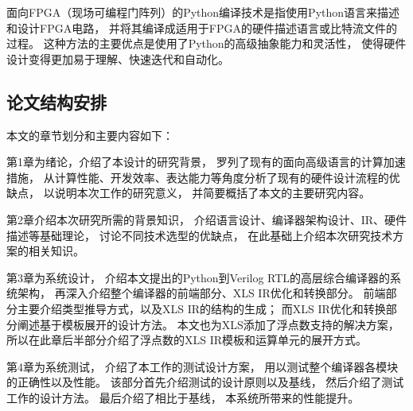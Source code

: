 面向FPGA（现场可编程门阵列）的Python编译技术是指使用Python语言来描述和设计FPGA电路，
并将其编译成适用于FPGA的硬件描述语言或比特流文件的过程。
这种方法的主要优点是使用了Python的高级抽象能力和灵活性，
使得硬件设计变得更加易于理解、快速迭代和自动化。

\subsection{论文结构安排}

本文的章节划分和主要内容如下：

第1章为绪论，介绍了本设计的研究背景，
罗列了现有的面向高级语言的计算加速措施，
从计算性能、开发效率、表达能力等角度分析了现有的硬件设计流程的优缺点，
以说明本次工作的研究意义，
并简要概括了本文的主要研究内容。

第2章介绍本次研究所需的背景知识，
介绍语言设计、编译器架构设计、IR、硬件描述等基础理论，
讨论不同技术选型的优缺点，
在此基础上介绍本次研究技术方案的相关知识。

第3章为系统设计，
介绍本文提出的Python到Verilog RTL的高层综合编译器的系统架构，
再深入介绍整个编译器的前端部分、XLS IR优化和转换部分。
前端部分主要介绍类型推导方式，以及XLS IR的结构的生成；
而XLS IR优化和转换部分阐述基于模板展开的设计方法。
本文也为XLS添加了浮点数支持的解决方案，
所以在此章后半部分介绍了浮点数的XLS IR模板和运算单元的展开方式。

第4章为系统测试，
介绍了本工作的测试设计方案，
用以测试整个编译器各模块的正确性以及性能。
该部分首先介绍测试的设计原则以及基线，
然后介绍了测试工作的设计方法。
最后介绍了相比于基线，
本系统所带来的性能提升。